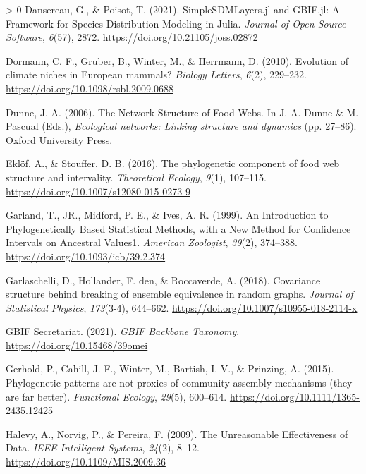 \documentclass[10pt,oneside]{article}
\newlength{\cslhangindent}
\newenvironment{CSLReferences}[3] %
 {%
  \setlength{\parindent}{0pt}
  \ifodd #1 \everypar{\setlength{\hangindent}{\cslhangindent}}\ignorespaces\fi
  \ifnum #2 > 0
  \setlength{\parskip}{#2\baselineskip}
  \fi
 }%
 {}
\begin{document}
\begin{CSLReferences}{1}{0}
\leavevmode\hypertarget{ref-Dansereau2021SimJl}{}%
Dansereau, G., \& Poisot, T. (2021). SimpleSDMLayers.jl and GBIF.jl: A
Framework for Species Distribution Modeling in Julia. \emph{Journal of
Open Source Software}, \emph{6}(57), 2872.
\url{https://doi.org/10.21105/joss.02872}

\leavevmode\hypertarget{ref-Dormann2010EvoCli}{}%
Dormann, C. F., Gruber, B., Winter, M., \& Herrmann, D. (2010).
Evolution of climate niches in European mammals? \emph{Biology Letters},
\emph{6}(2), 229--232. \url{https://doi.org/10.1098/rsbl.2009.0688}

\leavevmode\hypertarget{ref-Dunne2006NetStr}{}%
Dunne, J. A. (2006). The Network Structure of Food Webs. In J. A. Dunne
\& M. Pascual (Eds.), \emph{Ecological networks: Linking structure and
dynamics} (pp. 27--86). Oxford University Press.

\leavevmode\hypertarget{ref-Eklof2016PhyCom}{}%
Eklöf, A., \& Stouffer, D. B. (2016). The phylogenetic component of food
web structure and intervality. \emph{Theoretical Ecology}, \emph{9}(1),
107--115. \url{https://doi.org/10.1007/s12080-015-0273-9}

\leavevmode\hypertarget{ref-Garland1999IntPhy}{}%
Garland, T., JR., Midford, P. E., \& Ives, A. R. (1999). An Introduction
to Phylogenetically Based Statistical Methods, with a New Method for
Confidence Intervals on Ancestral Values1. \emph{American Zoologist},
\emph{39}(2), 374--388. \url{https://doi.org/10.1093/icb/39.2.374}

\leavevmode\hypertarget{ref-Garlaschelli2018CovStr}{}%
Garlaschelli, D., Hollander, F. den, \& Roccaverde, A. (2018).
Covariance structure behind breaking of ensemble equivalence in random
graphs. \emph{Journal of Statistical Physics}, \emph{173}(3-4),
644--662. \url{https://doi.org/10.1007/s10955-018-2114-x}

\leavevmode\hypertarget{ref-GBIFSecretariat2021GbiBac}{}%
GBIF Secretariat. (2021). \emph{GBIF Backbone Taxonomy}.
\url{https://doi.org/10.15468/39omei}

\leavevmode\hypertarget{ref-Gerhold2015PhyPat}{}%
Gerhold, P., Cahill, J. F., Winter, M., Bartish, I. V., \& Prinzing, A.
(2015). Phylogenetic patterns are not proxies of community assembly
mechanisms (they are far better). \emph{Functional Ecology},
\emph{29}(5), 600--614. \url{https://doi.org/10.1111/1365-2435.12425}

\leavevmode\hypertarget{ref-Halevy2009UnrEff}{}%
Halevy, A., Norvig, P., \& Pereira, F. (2009). The Unreasonable
Effectiveness of Data. \emph{IEEE Intelligent Systems}, \emph{24}(2),
8--12. \url{https://doi.org/10.1109/MIS.2009.36}


\end{CSLReferences}
\end{document}
